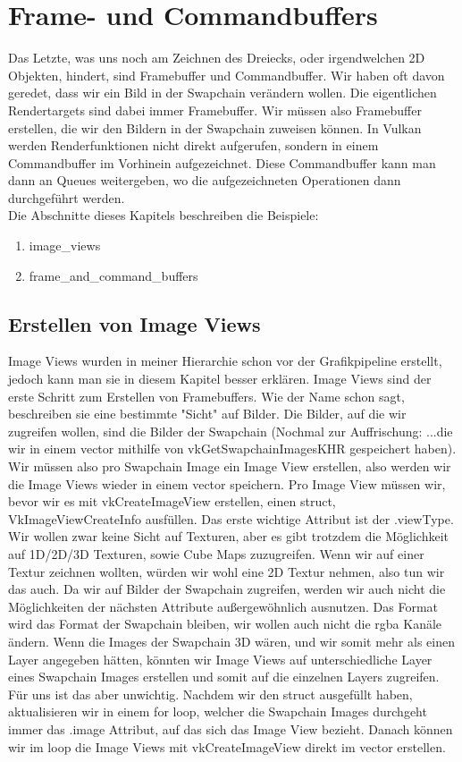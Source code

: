 \documentclass[11pt,a4paper]{report}
\begin{document}
\chapter{Frame- und Commandbuffers}
Das Letzte, was uns noch am Zeichnen des Dreiecks, oder irgendwelchen 2D Objekten, hindert, sind Framebuffer und Commandbuffer. Wir haben oft davon geredet, dass wir ein Bild in der Swapchain verändern wollen. Die eigentlichen Rendertargets sind dabei immer Framebuffer. Wir müssen also Framebuffer erstellen, die wir den Bildern in der Swapchain zuweisen können. In Vulkan werden Renderfunktionen nicht direkt aufgerufen, sondern in einem Commandbuffer im Vorhinein aufgezeichnet. Diese Commandbuffer kann man dann an Queues weitergeben, wo die aufgezeichneten Operationen dann durchgeführt werden.\\
Die Abschnitte dieses Kapitels beschreiben die Beispiele:
\begin{enumerate}
	\item{image\_views}
	\item{frame\_and\_command\_buffers}
\end{enumerate}

\section{Erstellen von Image Views}
Image Views wurden in meiner Hierarchie schon vor der Grafikpipeline erstellt, jedoch kann man sie in diesem Kapitel besser erklären. Image Views sind der erste Schritt zum Erstellen von Framebuffers. Wie der Name schon sagt, beschreiben sie eine bestimmte "Sicht" auf Bilder. Die Bilder, auf die wir zugreifen wollen, sind die Bilder der Swapchain (Nochmal zur Auffrischung: ...die wir in einem vector mithilfe von vkGetSwapchainImagesKHR gespeichert haben). Wir müssen also pro Swapchain Image ein Image View erstellen, also werden wir die Image Views wieder in einem vector speichern. Pro Image View müssen wir, bevor wir es mit vkCreateImageView erstellen, einen struct, VkImageViewCreateInfo ausfüllen. Das erste wichtige Attribut ist der .viewType. Wir wollen zwar keine Sicht auf Texturen, aber es gibt trotzdem die Möglichkeit auf 1D/2D/3D Texturen, sowie Cube Maps zuzugreifen. Wenn wir auf einer Textur zeichnen wollten, würden wir wohl eine 2D Textur nehmen, also tun wir das auch. Da wir auf Bilder der Swapchain zugreifen, werden wir auch nicht die Möglichkeiten der nächsten Attribute außergewöhnlich ausnutzen. Das Format wird das Format der Swapchain bleiben, wir wollen auch nicht die rgba Kanäle ändern. Wenn die Images der Swapchain 3D wären, und wir somit mehr als einen Layer angegeben hätten, könnten wir Image Views auf unterschiedliche Layer eines Swapchain Images erstellen und somit auf die einzelnen Layers zugreifen. Für uns ist das aber unwichtig. Nachdem wir den struct ausgefüllt haben, aktualisieren wir in einem for loop, welcher die Swapchain Images durchgeht immer das .image Attribut, auf das sich das Image View bezieht. Danach können wir im loop die Image Views mit vkCreateImageView direkt im vector erstellen.
\end{document}

